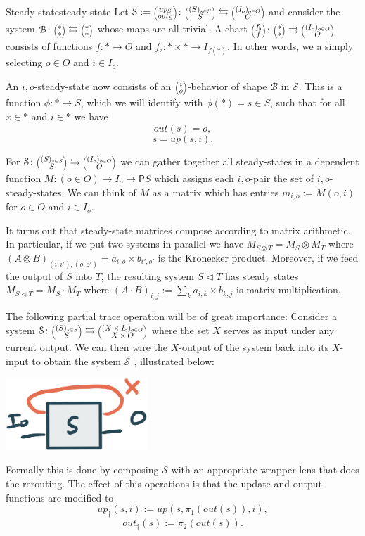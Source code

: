 \documentclass[12pt, a4paper]{article}
\theoremstyle{definition}
\theoremstyle{plain}
\theoremstyle{plain}
\theoremstyle{plain}
\theoremstyle{plain}
\theoremstyle{plain}
\theoremstyle{remark}
\theoremstyle{remark}
\newcommand{\mc}[1]{\mathcal{#1}}
\newcommand{\lens}[2]{\scaleobj{0.6}{\begin{pmatrix} \scaleobj{1.3}{{#1}} \\ \scaleobj{1.3}{{#2}} \end{pmatrix}}}
\begin{document}
\begin{tcdefinition}{Steady-state}{steady-state}
	Let $\mc{S} := \lens{up_S}{out_S} \colon \lens{(S)_{s \in S}}{S} \leftrightarrows \lens{(I_o)_{o \in O}}{O}$ and consider the system $\mc{B} \colon \lens{*}{*} \leftrightarrows \lens{*}{*}$ whose maps are all trivial. A chart $\lens{f_\flat}{f} \colon \lens{*}{*} \rightrightarrows \lens{(I_o)_{o \in O}}{O}$ consists of functions $f \colon * \rightarrow O$ and $f_\flat \colon * \times * \rightarrow I_{f(*)}$. In other words, we a simply selecting $o \in O$ and $i \in I_o$. 

	An $i,o$-steady-state now consists of an $\lens{i}{o}$-behavior of shape $\mc{B}$ in $\mc{S}$. This is a function $\phi \colon * \rightarrow S$, which we will identify with $\phi(*) = s \in S$, such that for all $x \in *$ and $i \in *$ we have
	$$out(s) = o, $$
	$$s = up(s,i).$$
\end{tcdefinition}

For $\mc{S} \colon \lens{(S)_{s \in S}}{S} \leftrightarrows \lens{(I_o)_{o \in O}}{O}$ we can gather together all steady-states in a dependent function $M: (o \in O) \rightarrow I_o \rightarrow \mathsf{P}S$ which assigns each $i,o$-pair the set of $i,o$-steady-states. We can think of $M$ as a matrix which has entries $m_{i,o} := M(o,i)$ for $o \in O$ and $i \in I_o$.

It turns out that steady-state matrices compose according to matrix arithmetic. In particular, if we put two systems in parallel we have $M_{S \otimes T} = M_S \otimes M_T $ where $(A \otimes B)_{(i,i'),(o,o')} = a_{i,o} \times b_{i',o'}$ is the Kronecker product. Moreover, if we feed the output of $S$ into $T$, the resulting system $S \triangleleft T$ has steady states $M_{S \triangleleft T} = M_S \cdot M_T$ where $(A \cdot B)_{i,j} := \sum_{k} a_{i,k} \times b_{k,j}$ is matrix multiplication.

The following partial trace operation will be of great importance: Consider a system $\mc{S} \colon \lens{(S)_{s \in S}}{S} \leftrightarrows \lens{(X \times I_o)_{o \in O} }{X \times O}$ where the set $X$ serves as input under any current output. We can then wire the $X$-output of the system back into its $X$-input to obtain the system $\mc{S}^\dagger$, illustrated below:
\begin{center}
\includegraphics[width = 0.4\textwidth]{trace.jpg}
\end{center}
Formally this is done by composing $\mc{S}$ with an appropriate wrapper lens that does the rerouting. The effect of this operations is that the update and output functions are modified to 
$$up_\dagger(s, i) := up(s,\pi_1(out(s)),i),$$ 
$$out_\dagger(s) := \pi_2(out(s)).$$
\end{document}
